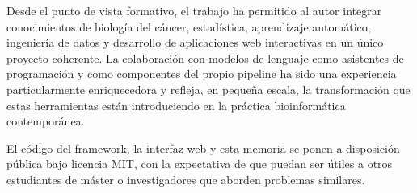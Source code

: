 Desde el punto de vista formativo, el trabajo ha permitido al autor
integrar conocimientos de biología del cáncer, estadística, aprendizaje
automático, ingeniería de datos y desarrollo de aplicaciones web
interactivas en un único proyecto coherente. La colaboración con
modelos de lenguaje como asistentes de programación y como componentes
del propio pipeline ha sido una experiencia particularmente enriquecedora
y refleja, en pequeña escala, la transformación que estas herramientas
están introduciendo en la práctica bioinformática contemporánea.

El código del framework, la interfaz web y esta memoria se ponen a
disposición pública bajo licencia MIT, con la expectativa de que puedan
ser útiles a otros estudiantes de máster o investigadores que aborden
problemas similares.
